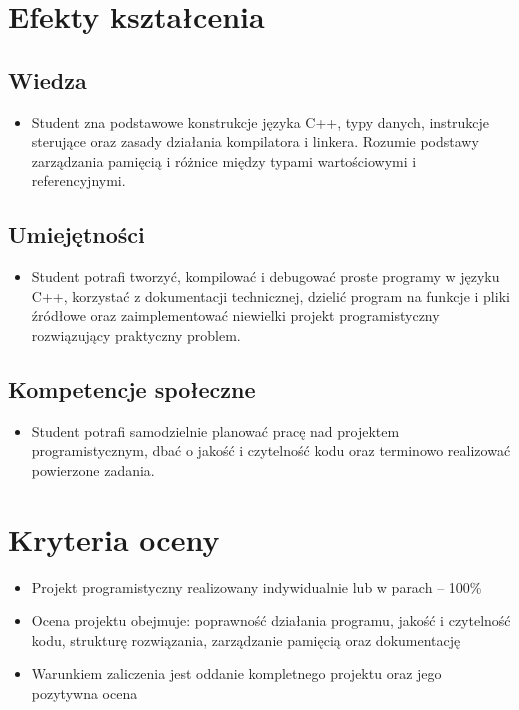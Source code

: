 \documentclass[12pt, a4paper]{article}
\begin{document}
\section{Efekty kształcenia}

\subsection*{Wiedza}
\begin{itemize}
  \item Student zna podstawowe konstrukcje języka C++, typy danych, instrukcje sterujące oraz zasady działania kompilatora i linkera. Rozumie podstawy zarządzania pamięcią i różnice między typami wartościowymi i referencyjnymi.
\end{itemize}

\subsection*{Umiejętności}
\begin{itemize}
  \item Student potrafi tworzyć, kompilować i debugować proste programy w języku C++, korzystać z dokumentacji technicznej, dzielić program na funkcje i pliki źródłowe oraz zaimplementować niewielki projekt programistyczny rozwiązujący praktyczny problem.
\end{itemize}

\subsection*{Kompetencje społeczne}
\begin{itemize}
  \item Student potrafi samodzielnie planować pracę nad projektem programistycznym, dbać o jakość i czytelność kodu oraz terminowo realizować powierzone zadania.
\end{itemize}

\section{Kryteria oceny}

\begin{itemize}
  \item Projekt programistyczny realizowany indywidualnie lub w parach – 100\%
  \item Ocena projektu obejmuje: poprawność działania programu, jakość i czytelność kodu, strukturę rozwiązania, zarządzanie pamięcią oraz dokumentację
  \item Warunkiem zaliczenia jest oddanie kompletnego projektu oraz jego pozytywna ocena
\end{itemize}
\end{document}
